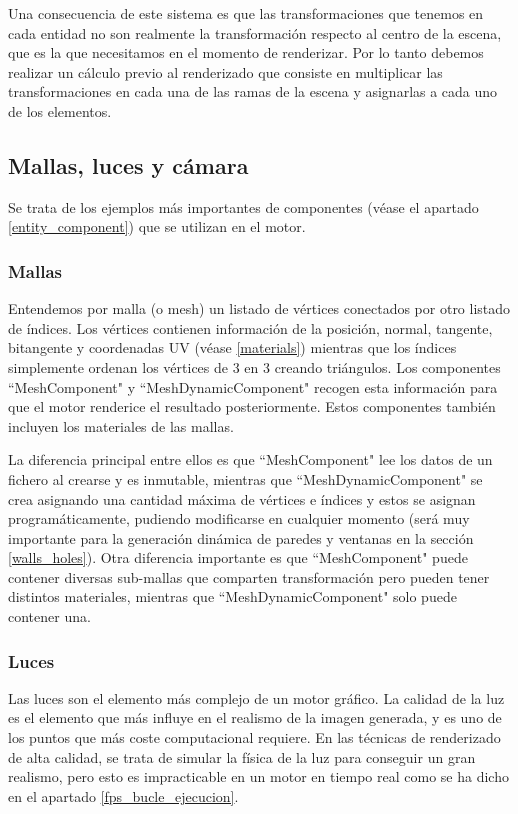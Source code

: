 Una consecuencia de este sistema es que las transformaciones que tenemos en cada entidad no son realmente la transformación respecto al centro de la escena, que es la que necesitamos en el momento de renderizar. Por lo tanto debemos realizar un cálculo previo al renderizado que consiste en multiplicar las transformaciones en cada una de las ramas de la escena y asignarlas a cada uno de los elementos.

\subsection{Mallas, luces y cámara}
\label{mesh_light_cam}
Se trata de los ejemplos más importantes de componentes (véase el apartado \ref{entity_component}) que se utilizan en el motor.

\subsubsection{Mallas}
Entendemos por malla (o mesh) un listado de vértices conectados por otro listado de índices. Los vértices contienen información de la posición, normal, tangente, bitangente y coordenadas UV (véase \ref{materials}) mientras que los índices simplemente ordenan los vértices de 3 en 3 creando triángulos. Los componentes ``MeshComponent" y ``MeshDynamicComponent" recogen esta información para que el motor renderice el resultado posteriormente. Estos componentes también incluyen los materiales de las mallas.

La diferencia principal entre ellos es que ``MeshComponent" lee los datos de un fichero al crearse y es inmutable, mientras que ``MeshDynamicComponent" se crea asignando una cantidad máxima de vértices e índices y estos se asignan programáticamente, pudiendo modificarse en cualquier momento (será muy importante para la generación dinámica de paredes y ventanas en la sección \ref{walls_holes}). Otra diferencia importante es que ``MeshComponent" puede contener diversas sub-mallas que comparten transformación pero pueden tener distintos materiales, mientras que ``MeshDynamicComponent" solo puede contener una.

\subsubsection{Luces}
Las luces son el elemento más complejo de un motor gráfico. La calidad de la luz es el elemento que más influye en el realismo de la imagen generada, y es uno de los puntos que más coste computacional requiere. En las técnicas de renderizado de alta calidad, se trata de simular la física de la luz para conseguir un gran realismo, pero esto es impracticable en un motor en tiempo real como se ha dicho en el apartado \ref{fps_bucle_ejecucion}.

